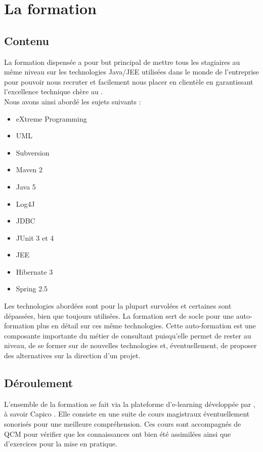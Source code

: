 \section{La formation}

\subsection{Contenu}

La formation dispensée a pour but principal de mettre tous les stagiaires au même niveau sur les technologies Java/JEE utilisées dans le monde de l'entreprise pour pouvoir nous recruter et facilement nous placer en clientèle en garantissant l'excellence technique chère au \excilysGroup{}.\\

Nous avons ainsi abordé les sujets suivants :

\begin{itemize}
	\item eXtreme Programming
	\item UML
	\item Subversion
	\item Maven 2
	\item Java 5
	\item Log4J
	\item JDBC
	\item JUnit 3 et 4
	\item JEE
	\item Hibernate 3
	\item Spring 2.5\\
\end{itemize}

Les technologies abordées sont pour la plupart survolées et certaines sont dépassées, bien que toujours utilisées. La formation sert de socle pour une auto-formation plus en détail sur ces même technologies. Cette auto-formation est une composante importante du métier de consultant puisqu'elle permet de rester au niveau, de se former sur de nouvelles technologies et, éventuellement, de proposer des alternatives sur la direction d'un projet.

\subsection{Déroulement}

L'ensemble de la formation se fait via la plateforme d'e-learning développée par \excilys{}, à savoir Capico \cite{capico}. Elle consiste en une suite de cours magistraux éventuellement sonorisés pour une meilleure compréhension. Ces cours sont accompagnés de QCM pour vérifier que les connaissances ont bien été assimilées ainsi que d'exercices pour la mise en pratique.

